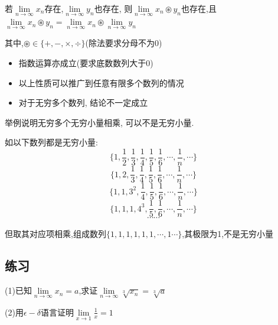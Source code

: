 \begin{theorem}[极限的四则运算]
    若$\lim \limits_{n \to \infty} x_n$存在,$\lim \limits_{n \to \infty} y_n$也存在,
    则$\lim \limits_{n \to \infty} x_n \circledast  y_n$也存在,且$\lim \limits_{n \to \infty} x_n \circledast  y_n = \lim \limits_{n \to \infty} x_n \circledast \lim \limits_{n \to \infty} y_n$

    \vspace{2pt}
    其中,$\circledast \in \{+,-,\times,\div \}$(除法要求分母不为0)
\end{theorem}

\begin{note}
    \begin{itemize}
        \item 指数运算亦成立(要求底数数列大于0)
        \item 以上性质可以推广到任意有限多个数列的情况
        \item 对于无穷多个数列, 结论不一定成立
    \end{itemize}
\end{note}

\begin{example}
    举例说明无穷多个无穷小量相乘, 可以不是无穷小量.
\end{example}

\begin{solution}

    如以下数列都是无穷小量:
    $$\{1,\frac{1}{2},\frac{1}{3},\frac{1}{4},\frac{1}{5},\frac{1}{6},\cdots,\frac{1}{n},\cdots\}$$
    $$\{1,2,\frac{1}{3},\frac{1}{4},\frac{1}{5},\frac{1}{6},\cdots,\frac{1}{n},\cdots\}$$
    $$\{1,1,3^2,\frac{1}{4},\frac{1}{5},\frac{1}{6},\cdots,\frac{1}{n},\cdots\}$$
    $$\{1,1,1,4^3,\frac{1}{5},\frac{1}{6},\cdots,\frac{1}{n},\cdots\}$$
    $$\cdots \cdots$$

    但取其对应项相乘,组成数列$\{1,1,1,1,1,1,\cdots,1\cdots\}$,其极限为1,不是无穷小量
\end{solution}

\subsection{练习}

\begin{exercise}

    (1)已知$\lim \limits_{n \to \infty} x_n = a$,求证$\lim \limits_{n \to \infty} \sqrt[3]{x_n}=\sqrt[3]{a} $

    (2)用$\epsilon-\delta$语言证明$\lim \limits_{x \to 1} \frac{1}{x}=1$
\end{exercise}

